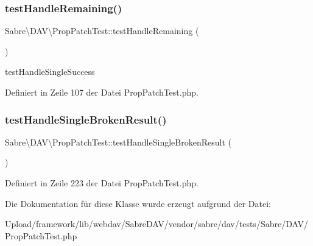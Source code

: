 \subsubsection{\texorpdfstring{test\+Handle\+Remaining()}{testHandleRemaining()}}
{\footnotesize\ttfamily Sabre\textbackslash{}\+D\+A\+V\textbackslash{}\+Prop\+Patch\+Test\+::test\+Handle\+Remaining (\begin{DoxyParamCaption}{ }\end{DoxyParamCaption})}

test\+Handle\+Single\+Success 

Definiert in Zeile 107 der Datei Prop\+Patch\+Test.\+php.

\mbox{\label{class_sabre_1_1_d_a_v_1_1_prop_patch_test_a718a1f9d4fa9266cade189d9e1c622d8}} 
\subsubsection{\texorpdfstring{test\+Handle\+Single\+Broken\+Result()}{testHandleSingleBrokenResult()}}
{\footnotesize\ttfamily Sabre\textbackslash{}\+D\+A\+V\textbackslash{}\+Prop\+Patch\+Test\+::test\+Handle\+Single\+Broken\+Result (\begin{DoxyParamCaption}{ }\end{DoxyParamCaption})}



Definiert in Zeile 223 der Datei Prop\+Patch\+Test.\+php.



Die Dokumentation für diese Klasse wurde erzeugt aufgrund der Datei\+:\begin{DoxyCompactItemize}
\item 
Upload/framework/lib/webdav/\+Sabre\+D\+A\+V/vendor/sabre/dav/tests/\+Sabre/\+D\+A\+V/Prop\+Patch\+Test.\+php\end{DoxyCompactItemize}
